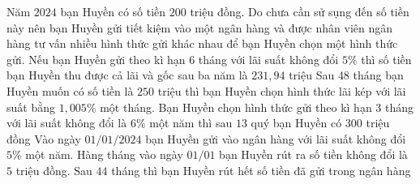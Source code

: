 \begin{ex}%
	Năm $2024$ bạn Huyền có số tiền $200$ triệu đồng. Do chưa cần sử sụng đến số tiền này nên bạn Huyền gửi tiết kiệm vào một ngân hàng và được nhân viên ngân hàng tư vấn nhiều hình thức gửi khác nhau để bạn Huyền chọn một hình thức gửi.
	\choiceTF
	{\True Nếu bạn Huyền gửi theo kì hạn $6$ tháng với lãi suất không đổi $5\%$ thì số tiền bạn Huyền thu được cả lãi và gốc sau ba năm là $231{,}94$ triệu}
	{\True Sau $48$ tháng bạn Huyền muốn có số tiền là $250$ triệu thì bạn Huyền chọn hình thức lãi kép với lãi suất bằng $1{,}005\%$ một tháng.}
	{Bạn Huyền chọn hình thức gửi theo kì hạn $3$ tháng với lãi suất không đổi là $6\%$ một năm thì sau $13$ quý bạn Huyền có $300$ triệu đồng}
	{Vào ngày $01/01/2024$ bạn Huyền gửi vào ngân hàng với lãi suất không đổi $5\%$ một năm. Hàng tháng vào ngày $01/01$ bạn Huyền rút ra số tiền không đổi là $5$ triệu đồng. Sau $44$ tháng thì bạn Huyền rút hết số tiền đã gửi trong ngân hàng}
\end{ex}
